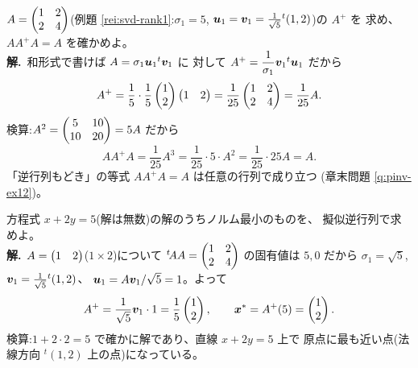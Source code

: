 \begin{rei}[例題・基本(階数 $1$ の擬似逆行列)]\label{rei:pinv-rank1}
$A = \begin{pmatrix}1 & 2 \\ 2 & 4\end{pmatrix}$(例題 \ref{rei:svd-rank1}:$\sigma_1 = 5$,
$\bm{u}_1 = \bm{v}_1 = \frac{1}{\sqrt{5}}{}^t(1, 2)$)の $A^{+}$ を
求め、$AA^{+}A = A$ を確かめよ。\\
\textbf{解.}\ 和形式で書けば $A = \sigma_1\bm{u}_1{}^t\bm{v}_1$ に
対して $A^{+} = \dfrac{1}{\sigma_1}\bm{v}_1{}^t\bm{u}_1$ だから
\[
A^{+} = \frac{1}{5}\cdot\frac{1}{5}\begin{pmatrix}1 \\ 2\end{pmatrix}\begin{pmatrix}1 & 2\end{pmatrix}
= \frac{1}{25}\begin{pmatrix}1 & 2 \\ 2 & 4\end{pmatrix} = \frac{1}{25}A.
\]
検算:$A^2 = \begin{pmatrix}5 & 10 \\ 10 & 20\end{pmatrix} = 5A$ だから
\[
AA^{+}A = \frac{1}{25}A^3 = \frac{1}{25}\cdot 5 \cdot A^2 = \frac{1}{25}
\cdot 25A = A.
\]
「逆行列もどき」の等式 $AA^{+}A = A$ は任意の行列で成り立つ
(章末問題 \ref{q:pinv-ex12})。
\end{rei}

\begin{rei}[例題・基本(ノルム最小の解)]\label{rei:pinv-minnorm}
方程式 $x + 2y = 5$(解は無数)の解のうちノルム最小のものを、
擬似逆行列で求めよ。\\
\textbf{解.}\ $A = \begin{pmatrix}1 & 2\end{pmatrix}$($1 \times 2$)について
${}^t\!AA = \begin{pmatrix}1 & 2 \\ 2 & 4\end{pmatrix}$ の固有値は $5, 0$ だから
$\sigma_1 = \sqrt{5}$, $\bm{v}_1 = \frac{1}{\sqrt{5}}{}^t(1, 2)$、
$\bm{u}_1 = A\bm{v}_1/\sqrt{5} = 1$。よって
\[
A^{+} = \frac{1}{\sqrt{5}}\bm{v}_1 \cdot 1 = \frac{1}{5}\begin{pmatrix}1 \\ 2\end{pmatrix},
\qquad
\bm{x}^* = A^{+}(5) = \begin{pmatrix}1 \\ 2\end{pmatrix}.
\]
検算:$1 + 2 \cdot 2 = 5$ で確かに解であり、直線 $x + 2y = 5$ 上で
原点に最も近い点(法線方向 ${}^t(1,2)$ 上の点)になっている。
\end{rei}

